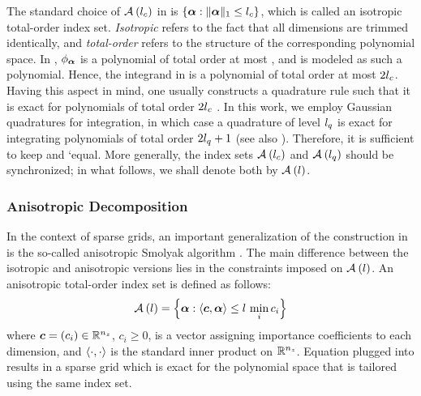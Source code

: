 The standard choice of $\multiindices{\lc}$ in  is
$\{ \multiindex: \norm[1]{\multiindex} \leq \lc \}$, which is called an
isotropic total-order index set. \emph{Isotropic} refers to the fact that all
dimensions are trimmed identically, and \emph{total-order} refers to the
structure of the corresponding polynomial space. In
, $\phi_{\multiindex}$ is a polynomial of total
order at most \lc, and \g is modeled as such a polynomial. Hence, the integrand
in  is a polynomial of total order at most $2 \lc$.
Having this aspect in mind, one usually constructs a quadrature rule such that
it is exact for polynomials of total order $2 \lc$ \cite{eldred2008}. In this
work, we employ Gaussian quadratures for integration, in which case a quadrature
of level $\lq$ is exact for integrating polynomials of total order $2 \lq + 1$
\cite{heiss2008} (see also ). Therefore, it is
sufficient to keep \lc and \lq equal. More generally, the index sets
$\multiindices{\lc}$ and $\multiindices{\lq}$ should be synchronized; in what
follows, we shall denote both by $\multiindices{l}$.

\subsubsection{Anisotropic Decomposition}

In the context of sparse grids, an important generalization of the construction
in  is the so-called anisotropic Smolyak algorithm
\cite{nobile2008}. The main difference between the isotropic and anisotropic
versions lies in the constraints imposed on $\multiindices{l}$. An anisotropic
total-order index set is defined as follows:
\begin{equation} \elab{anisotropic-total-order-index-set}
  \multiindices{l} = \left\{ \multiindex: \innerproduct{\v{c}}{\multiindex} \leq l \, \min_i c_i \right\}
\end{equation}
where $\v{c} = (c_i) \in \real^\nz$, $c_i \geq 0$, is a vector assigning
importance coefficients to each dimension, and $\innerproduct{\cdot}{\cdot}$ is
the standard inner product on $\real^\nz$. Equation
 plugged into 
results in a sparse grid which is exact for the polynomial space that is
tailored using the same index set.

